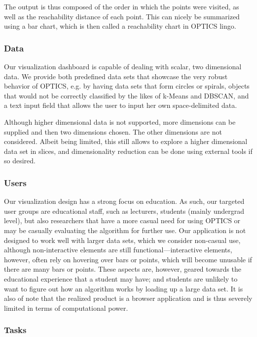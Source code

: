 \documentclass{vgtc} %
\begin{document}
The output is thus composed of the order in which the points were visited, as
well as the reachability distance of each point. This can nicely be summarized
using a bar chart, which is then called a reachability chart in OPTICS lingo.

\subsubsection{Data}

Our visualization dashboard is capable of dealing with scalar, two dimensional
data. We provide both predefined data sets that showcase the very robust
behavior of OPTICS, e.g. by having data sets that form circles or spirals,
objects that would not be correctly classified by the likes of k-Means and
DBSCAN, and a text input field that allows the user to input her own
space-delimited data.

Although higher dimensional data is not supported, more dimensions can be
supplied and then two dimensions chosen. The other dimensions are not
considered. Albeit being limited, this still allows to explore a higher
dimensional data set in slices, and dimensionality reduction can be done
using external tools if so desired.

\subsubsection{Users}

Our visualization design has a strong focus on education. As such, our targeted
user groups are educational staff, such as lecturers, students (mainly
undergrad level), but also researchers that have a more casual need for using
OPTICS or may be casually evaluating the algorithm for further use. Our
application is not designed to work well with larger data sets, which we
consider non-casual use, although non-interactive elements are still
functional---interactive elements, however, often rely on hovering over bars or
points, which will become unusable if there are many bars or points. These
aspects are, however, geared towards the educational experience that a student
may have; and students are unlikely to want to figure out how an algorithm
works by loading up a large data set. It is also of note that the realized
product is a browser application and is thus severely limited in terms of
computational power.

\subsubsection{Tasks}
\end{document}
